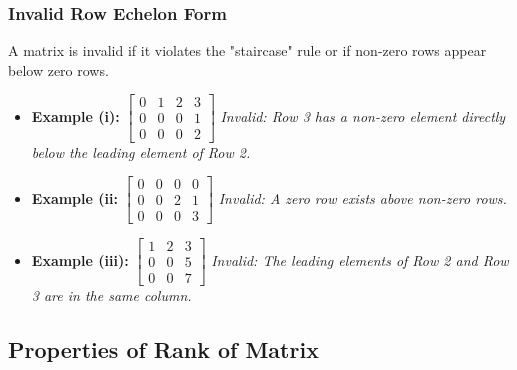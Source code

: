 \subsubsection{Invalid Row Echelon Form}
A matrix is invalid if it violates the "staircase" rule or if non-zero rows appear below zero rows.

\begin{itemize}
    \item \textbf{Example (i):} $\begin{bmatrix} 0 & 1 & 2 & 3 \\ 0 & 0 & 0 & 1 \\ 0 & 0 & 0 & 2 \end{bmatrix}$
    \quad \textit{Invalid: Row 3 has a non-zero element directly below the leading element of Row 2.}

    \item \textbf{Example (ii:} $\begin{bmatrix} 0 & 0 & 0 & 0 \\ 0 & 0 & 2 & 1 \\ 0 & 0 & 0 & 3 \end{bmatrix}$
    \quad \textit{Invalid: A zero row exists above non-zero rows.}

    \item \textbf{Example (iii):} $\begin{bmatrix} 1 & 2 & 3 \\ 0 & 0 & 5 \\ 0 & 0 & 7 \end{bmatrix}$
    \quad \textit{Invalid: The leading elements of Row 2 and Row 3 are in the same column.}
\end{itemize}


\subsection{Properties of Rank of Matrix}

